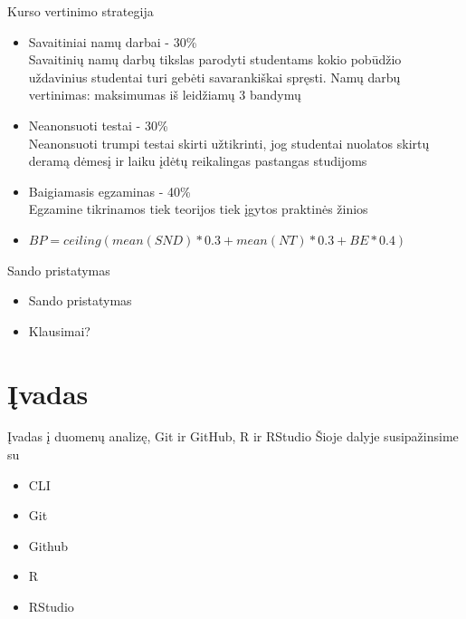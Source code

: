 \documentclass[11pt,xcolor=table]{beamer}
\begin{document}
\begin{frame}{Kurso vertinimo strategija}

\begin{itemize}
\item Savaitiniai namų darbai - 30\%
\\Savaitinių namų darbų tikslas parodyti studentams kokio pobūdžio uždavinius studentai turi gebėti savarankiškai spręsti. Namų darbų vertinimas: maksimumas iš leidžiamų 3 bandymų
\item Neanonsuoti testai - 30\%
\\Neanonsuoti trumpi testai skirti užtikrinti, jog studentai nuolatos skirtų deramą dėmesį ir laiku įdėtų reikalingas pastangas studijoms
\item Baigiamasis egzaminas - 40\%
\\Egzamine tikrinamos tiek teorijos tiek įgytos praktinės žinios 
\item $BP=ceiling(mean(SND)*0.3+mean(NT)*0.3+BE*0.4)$
\end{itemize}
\end{frame}
\begin{frame}{Sando pristatymas}
\begin{itemize}
\item Sando pristatymas
\item Klausimai?
\end{itemize}
\end{frame}

\section{Įvadas}
\begin{frame}{Įvadas į duomenų analizę, Git ir GitHub, R ir RStudio}
Šioje dalyje susipažinsime su
\begin{itemize}
\item CLI
\item Git 
\item Github
\item R 
\item RStudio
\end{itemize}
\end{frame}
\end{document}

